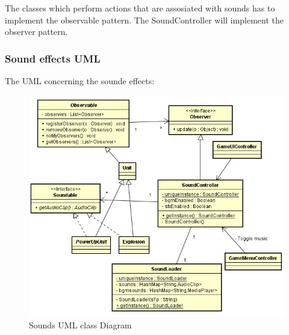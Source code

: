 The classes which perform actions that are assosiated with sounds has to implement the observable pattern.
The SoundController will implement the observer pattern.
\subsubsection{ Sound effects UML}
The UML concerning the sounde effects:
\begin{figure}[ht!]
\centering
\includegraphics[width=15cm]{sounds.jpg}
\caption{Sounds UML class Diagram}
\label{fig:1-2sounds}
\end{figure}
